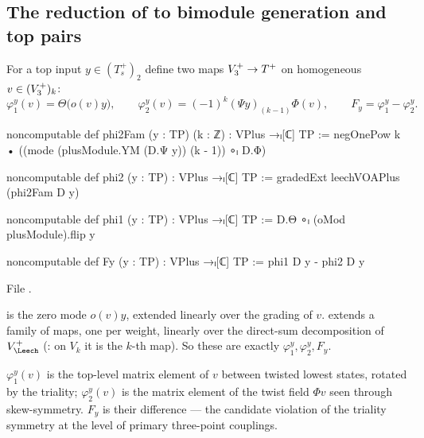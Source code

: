 \subsection{\texorpdfstring{The reduction of  to bimodule generation and top pairs}{The reduction of KeyTopV to bimodule generation and top pairs}}

For a top input $y\in(T_s^+)_2$ define two maps $V_3^{+}\to T^+$ on homogeneous $v\in(V_3^{+})_k$:
\begin{equation*}
\varphi_1^y(v)=\Theta\bigl(o(v)y\bigr),\qquad \varphi_2^y(v)=(-1)^k(\Psi y)_{(k-1)}\Phi(v),\qquad F_y=\varphi_1^y-\varphi_2^y .
\end{equation*}
\begin{definition}\label{ch14:def:Fy}
\begin{leancode}
noncomputable def phi2Fam (y : TP) (k : ℤ) : VPlus →ₗ[ℂ] TP :=
  negOnePow k • ((mode (plusModule.YM (D.Ψ y)) (k - 1)) ∘ₗ D.Φ)

noncomputable def phi2 (y : TP) : VPlus →ₗ[ℂ] TP := gradedExt leechVOAPlus (phi2Fam D y)

noncomputable def phi1 (y : TP) : VPlus →ₗ[ℂ] TP := D.Θ ∘ₗ (oMod plusModule).flip y

noncomputable def Fy (y : TP) : VPlus →ₗ[ℂ] TP := phi1 D y - phi2 D y
\end{leancode}
File .
\end{definition}

\begin{dictionary}
 is the zero mode $o(v)y$, extended linearly over the grading of $v$.
 extends a family of maps, one per weight, linearly over the direct-sum decomposition
of $V_\Leech^+$ (: on $V_k$ it is the $k$-th map).  So these are exactly
$\varphi_1^y,\varphi_2^y,F_y$.
\end{dictionary}

\begin{physics}
$\varphi_1^y(v)$ is the top-level matrix element of $v$ between twisted lowest states, rotated by the
triality; $\varphi_2^y(v)$ is the matrix element of the twist field $\Phi v$ seen through skew-symmetry.
$F_y$ is their difference — the candidate violation of the triality symmetry at the level of primary
three-point couplings.
\end{physics}

